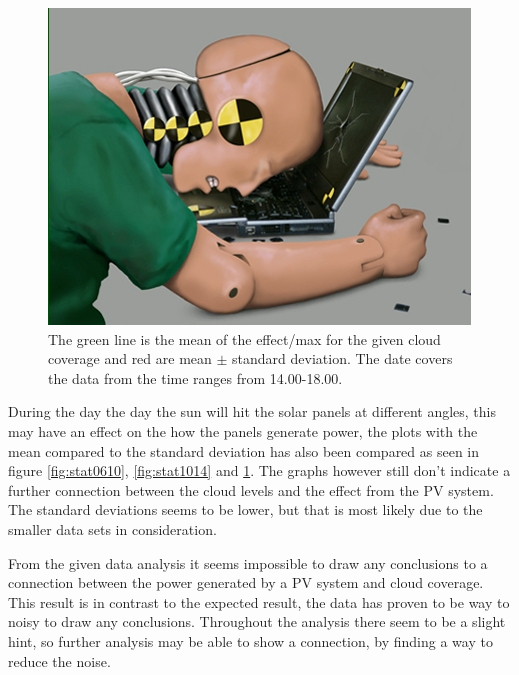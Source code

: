 \begin{figure}
  \centering
  \includegraphics{dummy.jpg}
  \caption{The green line is the mean of the effect/max for the given
    cloud coverage and red are mean $\pm$ standard deviation.  The
    date covers the data from the time ranges from 14.00-18.00.}
  \label{fig:stat1418}
\end{figure}

During the day the day the sun will hit the solar panels at different
angles, this may have an effect on the how the panels generate power,
the plots with the mean compared to the standard deviation has also
been compared as seen in figure \ref{fig:stat0610}, \ref{fig:stat1014}
and \ref{fig:stat1418}.  The graphs however still don't indicate a
further connection between the cloud levels and the effect from the PV
system.  The standard deviations seems to be lower, but that is most
likely due to the smaller data sets in consideration.

From the given data analysis it seems impossible to draw any
conclusions to a connection between the power generated by a PV system
and cloud coverage.  This result is in contrast to the expected
result, the data has proven to be way to noisy to draw any
conclusions.  Throughout the analysis there seem to be a slight hint,
so further analysis may be able to show a connection, by finding a way
to reduce the noise.

